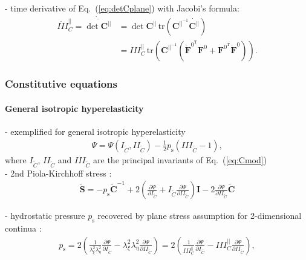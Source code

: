 \documentclass[a4paper,12pt]{report}
\newcommand{\fS}{\text{s}}
\newcommand{\bs}[1]{\boldsymbol{#1}}
\newcommand{\ps}{p_{\fS}} %
\begin{document}
- time derivative of Eq.~(\ref{eq:detCplane}) with Jacobi's formula:
\begin{align}
\dot{I\!\!I\!\!I}_{C}^{||} = \dot{\overline{\det \bs{C}^{||}}} &= \det \bs{C}^{||} \,\mathrm{tr}\left(\bs{C}^{||^{-1}} \dot{\bs{C}^{||}}\right) \\
&= I\!\!I\!\!I_{C}^{||}\,\mathrm{tr}\left(\bs{C}^{||^{-1}} \left(\dot{\bs{F}}^{0^\mathrm{T}}\bs{F}^{0} + \bs{F}^{0^\mathrm{T}}\dot{\bs{F}}^{0}\right)\right).
\end{align}

\subsubsection{Constitutive equations}
\paragraph{General isotropic hyperelasticity}
- exemplified for general isotropic hyperelasticity
\begin{align}
\mathit{\Psi} = \mathit{\Psi}(I_{\tilde{C}},I\!\!I_{\tilde{C}}) - \frac{1}{2}\ps(I\!\!I\!\!I_{\tilde{C}}-1), \label{eq:sef_red_solid_generic}
\end{align}
where $I_{\tilde{C}}$, $I\!\!I_{\tilde{C}}$ and $I\!\!I\!\!I_{\tilde{C}}$ are the principal invariants of Eq.~(\ref{eq:Cmod})\\

- 2nd Piola-Kirchhoff stress \cite{holzapfel2000}:
\begin{align}
\tilde{\bs{S}} = -\ps \tilde{\bs{C}}^{-1} + 2\left(\frac{\partial \mathit{\Psi}}{\partial I_{\tilde{C}}} + I_{\tilde{C}} \frac{\partial \mathit{\Psi}}{\partial I\!\!I_{\tilde{C}}}\right)\bs{I} - 2\frac{\partial \mathit{\Psi}}{\partial I\!\!I_{\tilde{C}}} \tilde{\bs{C}} \label{eq:S_membrane_stress}
\end{align}

- hydrostatic pressure $\ps$ recovered by plane stress assumption for 2-dimensional continua \cite{holzapfel1996,holzapfel2000}:
\begin{align}
\ps = 2 \left( \frac{1}{\lambda_{\xi}^2 \lambda_{\eta}^2} \frac{\partial \mathit{\Psi}}{\partial I_{\tilde{C}}} - \lambda_{\xi}^2 \lambda_{\eta}^2 \frac{\partial \mathit{\Psi}}{\partial I\!\!I_{\tilde{C}}} \right) = 2 \left( \frac{1}{I\!\!I\!\!I_{C}^{||}} \frac{\partial \mathit{\Psi}}{\partial I_{\tilde{C}}} - I\!\!I\!\!I_{C}^{||} \frac{\partial \mathit{\Psi}}{\partial I\!\!I_{\tilde{C}}} \right) \label{eq:p_mem},
\end{align}
\end{document}
